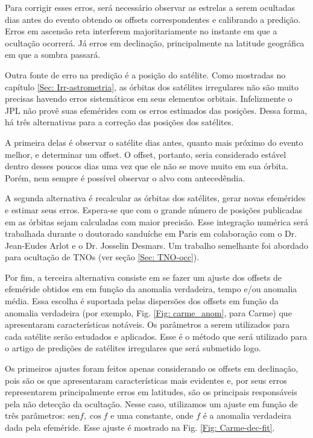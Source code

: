 \documentclass[12pt,a4paper]{monografia}
\begin{document}
Para corrigir esses erros, será necessário observar as estrelas a serem ocultadas dias antes do evento obtendo os offsets correspondentes e calibrando a predição. Erros em ascensão reta interferem majoritariamente no instante em que a ocultação ocorrerá. Já erros em declinação, principalmente na latitude geográfica em que a sombra passará.

Outra fonte de erro na predição é a posição do satélite. Como mostradas no capítulo \ref{Sec: Irr-astrometria}, as órbitas dos satélites irregulares não são muito precisas havendo erros sistemáticos em seus elementos orbitais. Infelizmente o JPL não provê suas efemérides com os erros estimados das posições. Dessa forma, há três alternativas para a correção das posições dos satélites.

A primeira delas é observar o satélite dias antes, quanto mais próximo do evento melhor, e determinar um offset. O offset, portanto, seria considerado estável dentro desses poucos dias uma vez que ele não se move muito em sua órbita. Porém, nem sempre é possível observar o alvo com antecedêndia.

A segunda alternativa é recalcular as órbitas dos satélites, gerar novas efemérides e estimar seus erros. Espera-se que com o grande número de posições publicadas em \cite{GomesJunior2015-Irregular} as órbitas sejam calculadas com maior precisão. Esse integração numérica será trabalhada durante o doutorado sanduíche em Paris em colaboração com o Dr. Jean-Eudes Arlot e o Dr. Josselin Desmars. Um trabalho semelhante foi abordado para ocultação de TNOs (ver seção \ref{Sec: TNO-occ}).

Por fim, a terceira alternativa consiste em se fazer um ajuste dos offsets de efeméride obtidos em \cite{GomesJunior2015-Irregular} em função da anomalia verdadeira, tempo e/ou anomalia média. Essa escolha é suportada pelas dispersões dos offsets em função da anomalia verdadeira (por exemplo, Fig. \ref{Fig: carme_anom}, para Carme) que apresentaram características notáveis. Os parâmetros a serem utilizados para cada satélite serão estudados e aplicados. Esse é o método que será utilizado para o artigo de predições de satélites irregulares que será submetido logo.

Os primeiros ajustes foram feitos apenas considerando os offsets em declinação, pois são os que apresentaram características mais evidentes e, por seus erros representarem principalmente erros em latitudes, são os principais responsáveis pela não detecção da ocultação. Nesse caso, utilizamos um ajuste em função de três parâmetros: sen${f}, \cos{f}$ e uma constante, onde $f$ é a anomalia verdadeira dada pela efeméride. Esse ajuste é mostrado na Fig. \ref{Fig: Carme-dec-fit}.
\end{document}
